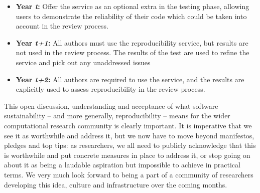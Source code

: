 \documentclass[conference]{IEEEtran}
\begin{document}
\begin{itemize}
\item {\textbf{Year {\emph{t}}:}} Offer the service as an optional extra in the
  testing phase, allowing users to demonstrate the reliability of
  their code which could be taken into account in the review process.
\item {\textbf{Year {\emph{t+1}}:}} All authors must use the reproducibility
  service, but results are not used in the review process. The results
  of the test are used to refine the service and pick out any
  unaddressed issues
\item {\textbf{Year {\emph{t+2}}:}} All authors are required to use the service, and
  the results are explicitly used to assess reproducibility in the
  review process.
\end{itemize}

This open discussion, understanding and acceptance of what software
sustainability -- and more generally, reproducibility -- means for the
wider computational research community is clearly important. It is
imperative that we see it as worthwhile and address it, but we now
have to move beyond manifestos, pledges and top tips: as researchers,
we all need to publicly acknowledge that this is worthwhile and put
concrete measures in place to address it, or stop going on about it as
being a laudable aspiration but impossible to achieve in practical
terms. We very much look forward to being a part of a community of
researchers developing this idea, culture and infrastructure over the
coming months.






\end{document}
